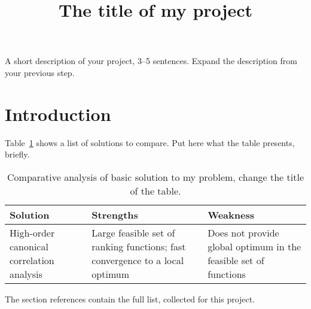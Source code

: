 \documentclass[12pt]{article}
\title{The title of my project}
\date{}
\begin{document}
\maketitle
A short description of your project, 3--5 sentences. Expand the description from your previous step.

\section{Introduction}
Table~\ref{tab:intro_comparative} shows a list of solutions to compare. Put here what the table presents, briefly. 

\begin{table}[!htbp]
\label{tab:intro_comparative}
\caption{Comparative analysis of basic solution to my problem, change the title of the table.}
\begin{tabular}{p{5cm}|p{5cm}|p{5cm}}
	Solution & Strengths & Weakness \\
	\hline
	High-order canonical correlation analysis~\cite{9095246} & 
	Large feasible set of ranking functions; fast convergence to a local optimum &
	Does not provide global optimum in the feasible set of functions \\
\end{tabular} 
\end{table}
 
 The section references contain the full list, collected for this project. 
\nocite{*} %



\end{document}
